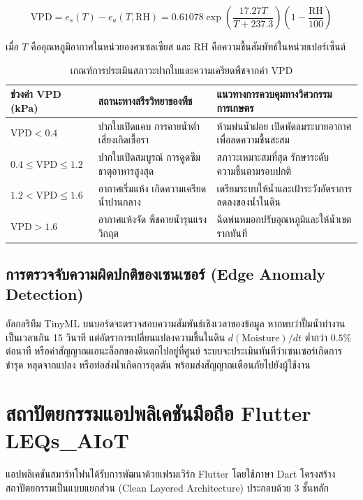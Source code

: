 \begin{equation}
\text{VPD} = e_s(T) - e_a(T, \text{RH}) = 0.61078 \exp\left( \frac{17.27 T}{T + 237.3} \right) \left( 1 - \frac{\text{RH}}{100} \right)
\end{equation}

เมื่อ $T$ คืออุณหภูมิอากาศในหน่วยองศาเซลเซียส และ $\text{RH}$ คือความชื้นสัมพัทธ์ในหน่วยเปอร์เซ็นต์

\begin{table}[H]
\centering
\caption{เกณฑ์การประเมินสภาวะปากใบและความเครียดพืชจากค่า VPD}
\label{tab:vpd_plant_stress_criteria}
\begin{tabularx}{\textwidth}{p{3.0cm}p{3.5cm}Y}
\toprule
\textbf{ช่วงค่า VPD (kPa)} & \textbf{สถานะทางสรีรวิทยาของพืช} & \textbf{แนวทางการควบคุมทางวิศวกรรมการเกษตร} \\
\midrule
$\text{VPD} < 0.4$ & ปากใบเปิดแคบ การคายน้ำต่ำ เสี่ยงเกิดเชื้อรา & ห้ามพ่นน้ำฝอย เปิดพัดลมระบายอากาศเพื่อลดความชื้นสะสม \\
$0.4 \le \text{VPD} \le 1.2$ & ปากใบเปิดสมบูรณ์ การดูดซึมธาตุอาหารสูงสุด & สภาวะเหมาะสมที่สุด รักษาระดับความชื้นตามรอบปกติ \\
$1.2 < \text{VPD} \le 1.6$ & อากาศเริ่มแห้ง เกิดความเครียดน้ำปานกลาง & เตรียมระบบให้น้ำและเฝ้าระวังอัตราการลดลงของน้ำในดิน \\
$\text{VPD} > 1.6$ & อากาศแห้งจัด พืชคายน้ำรุนแรงวิกฤต & ฉีดพ่นหมอกปรับอุณหภูมิและให้น้ำเขตรากทันที \\
\bottomrule
\end{tabularx}
\end{table}

\subsection{การตรวจจับความผิดปกติของเซนเซอร์ (Edge Anomaly Detection)}
อัลกอริทึม TinyML บนบอร์ดจะตรวจสอบความสัมพันธ์เชิงเวลาของข้อมูล หากพบว่าปั๊มน้ำทำงานเป็นเวลาเกิน 15 วินาที แต่อัตราการเปลี่ยนแปลงความชื้นในดิน $d(\text{Moisture})/dt$ ต่ำกว่า $0.5\%$ ต่อนาที หรือค่าสัญญาณแอนะล็อกของดินตกไปอยู่ที่ศูนย์ ระบบจะประเมินทันทีว่าเซนเซอร์เกิดการชำรุด หลุดจากแปลง หรือท่อส่งน้ำเกิดการอุดตัน พร้อมส่งสัญญาณเตือนภัยไปยังผู้ใช้งาน

\section{สถาปัตยกรรมแอปพลิเคชันมือถือ Flutter LEQs\_AIoT}

แอปพลิเคชันสมาร์ทโฟนได้รับการพัฒนาด้วยเฟรมเวิร์ก Flutter โดยใช้ภาษา Dart โครงสร้างสถาปัตยกรรมเป็นแบบแยกส่วน (Clean Layered Architecture) ประกอบด้วย 3 ชั้นหลัก

